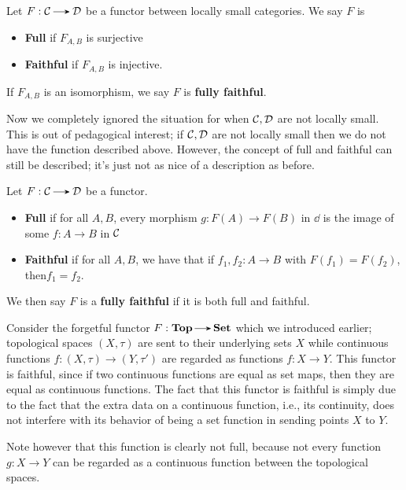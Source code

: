     \begin{definition}
        Let $F: \cc\to \dd$ be a functor between locally small categories. 
        We say $F$ is 
        \begin{itemize}
            \item \textbf{Full} if $F_{A,B}$ is surjective
            \item \textbf{Faithful} if $F_{A,B}$ is injective.
        \end{itemize}
        If $F_{A,B}$ is an isomorphism, we say $F$ is \textbf{fully faithful}.
    \end{definition}

    Now we completely ignored the situation for when $\mathcal{C}, \mathcal{D}$ are not locally small. 
    This is out of pedagogical interest; if $\mathcal{C}, \mathcal{D}$ are not locally small then we do 
    not have the function described above. However, the concept of full and faithful 
    can still be described; it's just not as nice of a description as before.

    \begin{definition}
        Let $F: \cc \to \dd$ be a functor.
        \begin{itemize}
            \item \textbf{Full} if for all $A, B$, every morphism 
            $g: F(A) \to F(B)$ in $\dd$ is the image of some $f: A \to B$ in $\mathcal{C}$ 
            \item \textbf{Faithful} if for all $A, B$, we have that
            if $f_1, f_2: A \to B$ with $F(f_1) = F(f_2)$, then$f_1 = f_2$.
        \end{itemize}
        We then say $F$ is a \textbf{fully faithful} if it is both full and faithful.
    \end{definition}

    \begin{example}
        Consider the forgetful functor $F: \top \to \Set$ 
        which we introduced earlier; topological spaces $(X, \tau)$ are 
        sent to their underlying sets $X$ while continuous functions 
        $f: (X, \tau) \to (Y, \tau')$ are regarded as functions  
        $f: X \to Y$. This functor is faithful, since if two continuous functions 
        are equal as set maps, then they are equal as continuous functions. 
        The fact that this functor is faithful is simply due to the fact that the 
        extra data on a continuous function, i.e., its continuity, does not 
        interfere with its behavior of being a set function in 
        sending points $X$ to  $Y$.
        
        Note however that this function is clearly not full, because not every 
        function $g: X \to Y$ can be regarded as a continuous function between 
        the topological spaces. 
    \end{example}

